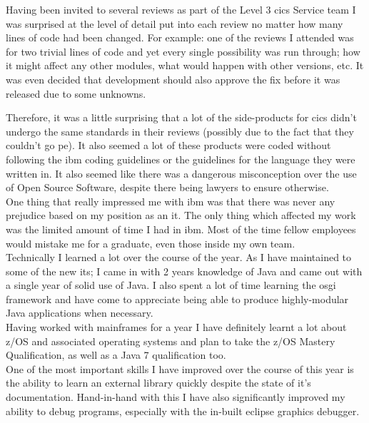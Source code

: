 \documentclass[a4paper,11pt]{report}
\begin{document}
Having been invited to several reviews as part of the Level 3 \gls{cics} Service team I was 
surprised at the level of detail put into each review no matter how many lines of code had been
changed. For example: one of the reviews I attended was for two trivial lines of code and yet every
single possibility was run through; how it might affect any other modules, what would happen with
other versions, etc. It was even decided that development should also approve the fix before it was
released due to some unknowns.

Therefore, it was a little surprising that a lot of the side-products for \gls{cics} didn't undergo
the same standards in their reviews (possibly due to the fact that they couldn't go \gls{pe}). It
also seemed a lot of these products were coded without following the \gls{ibm} coding guidelines or
the guidelines for the language they were written in. It also seemed like there was a dangerous
misconception over the use of Open Source Software, despite there being lawyers to ensure 
otherwise. \\

One thing that really impressed me with \gls{ibm} was that there was never any prejudice based on
my position as an \gls{it}. The only thing which affected my work was the limited amount of time I
had in \gls{ibm}. Most of the time fellow employees would mistake me for a graduate, even those 
inside my own team. \\

Technically I learned a lot over the course of the year. As I have maintained to some of the new
\gls{it}s; I came in with 2 years knowledge of Java and came out with a single year of solid use 
of Java. I also spent a lot of time learning the \gls{osgi} framework and have come to appreciate
being able to produce highly-modular Java applications when necessary. \\

Having worked with mainframes for a year I have definitely learnt a lot about z/OS and associated
operating systems and plan to take the z/OS Mastery Qualification, as well as a Java 7 
qualification too. \\

One of the most important skills I have improved over the course of this year is the ability to
learn an external library quickly despite the state of it's documentation. Hand-in-hand with this
I have also significantly improved my ability to debug programs, especially with the in-built 
eclipse graphics debugger. \\
\end{document}
